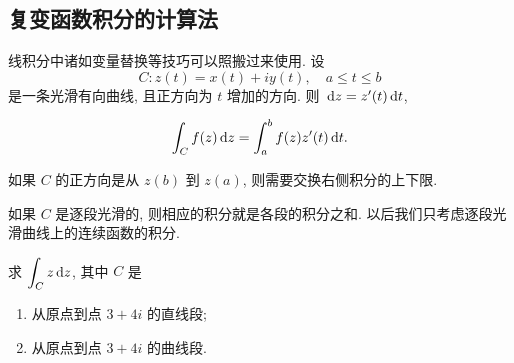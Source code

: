 \subsection{复变函数积分的计算法}

线积分中诸如变量替换等技巧可以照搬过来使用.
设
\[C:z(t)=x(t)+iy(t),\quad a\le t\le b\]
是一条光滑有向曲线, 且正方向为 $t$ 增加的方向.
则 $\,\mathrm{d} z=z'(t)\,\mathrm{d} t$,

\begin{theorem}[复变函数积分的一般计算方法]
	\begin{equation}
		\int_Cf(z)\,\mathrm{d} z=\int_a^b f(z)z'(t)\,\mathrm{d} t.
	\end{equation}
\end{theorem}
\noindent 如果 $C$ 的正方向是从 $z(b)$ 到 $z(a)$, 则需要交换右侧积分的上下限.

如果 $C$ 是逐段光滑的, 则相应的积分就是各段的积分之和.
以后我们\alert{只考虑逐段光滑曲线上的连续函数的积分}.

\begin{example}
	求 $\displaystyle\int_Cz\,\mathrm{d} z$, 其中 $C$ 是
	\begin{enumerate}
		\item 从原点到点 $3+4i$ 的直线段;
		\item 从原点到点 $3+4i$ 的曲线段.
	\end{enumerate}
\end{example}

\begin{figure}[hbpt]
	\centering
	\begin{minipage}{.48\textwidth}
		\centering
	\end{minipage}
	\begin{minipage}{.48\textwidth}
		\centering
	\end{minipage}
\end{figure}

